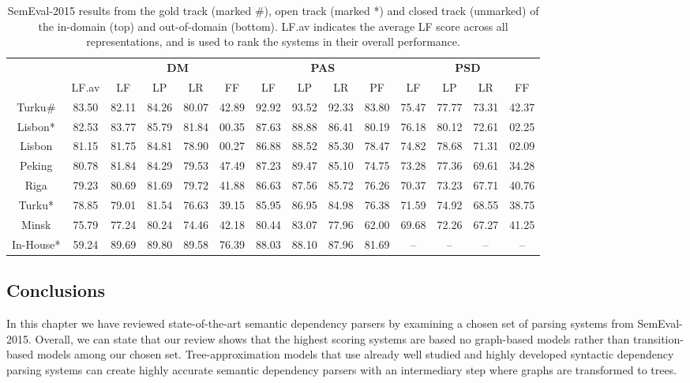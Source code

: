 \begin{table}
\begin{tabular}{@{}cccccccccccccc@{}}
        \\
        \toprule
        \multicolumn{1}{c}{ }
        & \multicolumn{1}{c}{ }
        & \multicolumn{4}{c}{\textbf{DM}}
        & \multicolumn{4}{c}{\textbf{PAS}}
        & \multicolumn{4}{c}{\textbf{PSD}} \\
        \cmidrule(lr){3-6}
        \cmidrule(lr){7-10}
        \cmidrule(lr){11-14}
        &
        LF.av &
        LF & LP & LR & FF &
        LF & LP & LR & PF &
        LF & LP & LR & FF \\
        \midrule
        Turku\# & 83.50 & 82.11 & 84.26 & 80.07 & 42.89 & 92.92 & 93.52 & 92.33 & 83.80 & 75.47 & 77.77 & 73.31 & 42.37 \\
        Lisbon* & 82.53 & 83.77 & 85.79 & 81.84 & 00.35 & 87.63 & 88.88 & 86.41 & 80.19 & 76.18 & 80.12 & 72.61 & 02.25 \\
        Lisbon & 81.15 & 81.75 & 84.81 & 78.90 & 00.27 & 86.88 & 88.52 & 85.30 & 78.47 & 74.82 & 78.68 & 71.31 & 02.09 \\
        Peking & 80.78 & 81.84 & 84.29 & 79.53 & 47.49 & 87.23 & 89.47 & 85.10 & 74.75 & 73.28 & 77.36 & 69.61 & 34.28 \\
        Riga & 79.23 & 80.69 & 81.69 & 79.72 & 41.88 & 86.63 & 87.56 & 85.72 & 76.26 & 70.37 & 73.23 & 67.71 & 40.76 \\
        Turku* & 78.85 & 79.01 & 81.54 & 76.63 & 39.15 & 85.95 & 86.95 & 84.98 & 76.38 & 71.59 & 74.92 & 68.55 & 38.75 \\
        Minsk & 75.79 & 77.24 & 80.24 & 74.46 & 42.18 & 80.44 & 83.07 & 77.96 & 62.00 & 69.68 & 72.26 & 67.27 & 41.25 \\
        In-House* & 59.24 & 89.69 & 89.80 & 89.58 & 76.39 & 88.03 & 88.10 & 87.96 & 81.69 & – & – & – & – \\
        \bottomrule
    \end{tabular}
    \caption{SemEval-2015 results from the gold track (marked \#), open track (marked *) and closed track (unmarked) of the in-domain (top) and out-of-domain (bottom). LF.av indicates the average LF score across all representations, and is used to rank the systems in their overall performance.}
    \label{fig:results}
\end{table}

\subsection{Conclusions}

In this chapter we have reviewed state-of-the-art semantic dependency parsers by examining a chosen set of parsing systems from SemEval-2015. Overall, we can state that our review shows that the highest scoring systems are based no graph-based models rather than transition-based models among our chosen set. Tree-approximation models that use already well studied and highly developed syntactic dependency parsing systems can create highly accurate semantic dependency parsers with an intermediary step where graphs are transformed to trees.

